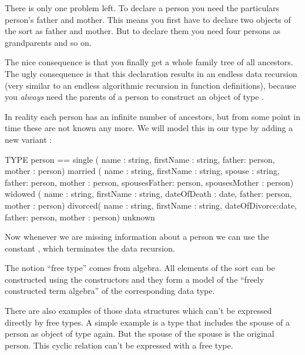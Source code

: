 There is only one problem left.
To declare a person you need the particulars person's father and mother.
This means you  first have to declare two objects of the sort
 as father and mother.
But to declare them you need four persons as grandparents and so on.

The nice consequence is that you finally get a whole family tree of
all ancestors. 
The ugly consequence is that this declaration results in an endless
data recursion (very similar to an endless algorithmic recursion in
function definitions), because you {\em always\/} need the parents of
a person to construct an object of type .

In reality each person has an infinite number of ancestors, but from some
point in time these are not known any more.
We will model this in our type by adding a new variant
:
\begin{prog}
       TYPE person == single  ( name : string, firstName : string,
                                father: person, mother : person)
                      married ( name : string, firstName : string,
                                spouse : string,
                                father: person, mother : person,
                                spousesFather: person, 
                                spousesMother : person)
                      widowed ( name : string, firstName : string,
                                dateOfDeath : date,
                                father: person, mother : person)
                      divorced( name : string, firstName : string,
                                dateOfDivorce:date,
                                father: person, mother : person)
                      unknown
\end{prog}
Now whenever we are missing information  about a person we can use
the constant 
, which terminates the data recursion.

\experienced The notion ``free type'' comes from algebra. 
All elements of the sort  can be constructed using the
constructors and they form a model of the ``freely constructed term
algebra'' of the corresponding data type.

\advanced There are also examples of those data structures which
can't be expressed directly by free types.
A simple example is a type that includes the spouse of a person as
object of type  again.
But the spouse of the spouse is the original person. 
This cyclic relation can't be expressed with a free type.

